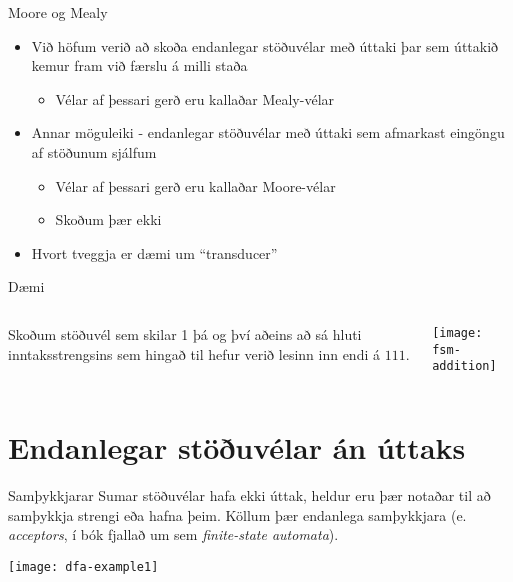 \documentclass{beamer}
\begin{document}
\begin{frame}{Moore og Mealy}
\begin{itemize}
 \item Við höfum verið að skoða endanlegar stöðuvélar með úttaki þar sem úttakið kemur fram við færslu á milli staða
 \begin{itemize}
  \item Vélar af þessari gerð eru kallaðar Mealy-vélar
 \end{itemize}
 \item Annar möguleiki - endanlegar stöðuvélar með úttaki sem afmarkast eingöngu af stöðunum sjálfum
 \begin{itemize}
  \item Vélar af þessari gerð eru kallaðar Moore-vélar
  \item Skoðum þær ekki
 \end{itemize}
 \item Hvort tveggja er dæmi um ``transducer''
\end{itemize}
\end{frame}

\begin{frame}{Dæmi}
\begin{columns}
Skoðum stöðuvél sem skilar 1 þá og því aðeins að sá hluti inntaksstrengsins sem hingað til hefur verið lesinn inn endi á $111$.

\texttt{[image: fsm-addition]}
\end{columns}
\end{frame}

\section{Endanlegar stöðuvélar án úttaks}

\begin{frame}{Samþykkjarar}
Sumar stöðuvélar hafa ekki úttak, heldur eru þær notaðar til að samþykkja strengi eða hafna þeim. Köllum þær endanlega samþykkjara (e. \emph{acceptors}, í bók fjallað um sem \emph{finite-state automata}). 

\begin{center}
\texttt{[image: dfa-example1]}
\end{center}


\end{frame}
\end{document}
